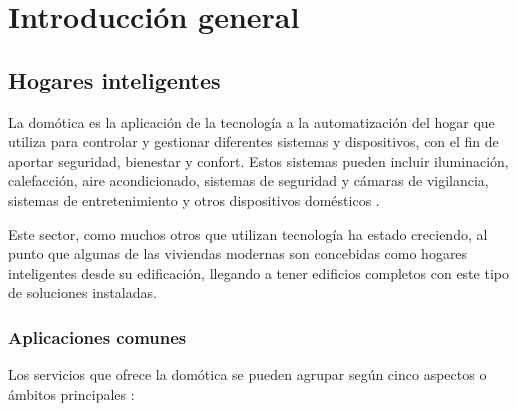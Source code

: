 
\chapter{Introducción general} %

\label{Chapter1} %
\label{IntroGeneral}


\newcommand{\keyword}[1]{\textbf{#1}}
\newcommand{\tabhead}[1]{\textbf{#1}}
\newcommand{\code}[1]{\texttt{#1}}
\newcommand{\file}[1]{\texttt{\bfseries#1}}
\newcommand{\option}[1]{\texttt{\itshape#1}}
\newcommand{\grados}{$^{\circ}$}



\section{Hogares inteligentes}

La domótica es la aplicación de la tecnología a la automatización del hogar que utiliza para controlar y gestionar diferentes sistemas y dispositivos, con el fin de aportar seguridad, bienestar y confort. Estos sistemas pueden incluir iluminación, calefacción, aire acondicionado, sistemas de seguridad y cámaras de vigilancia, sistemas de entretenimiento y otros dispositivos domésticos \citep{1}.

Este sector, como muchos otros que utilizan tecnología ha estado creciendo, al punto que algunas de las viviendas modernas son concebidas como hogares inteligentes desde su edificación, llegando a tener edificios completos con este tipo de soluciones instaladas.

\subsection{Aplicaciones comunes}

Los servicios que ofrece la domótica se pueden agrupar según cinco aspectos o ámbitos principales \citep{2}:

